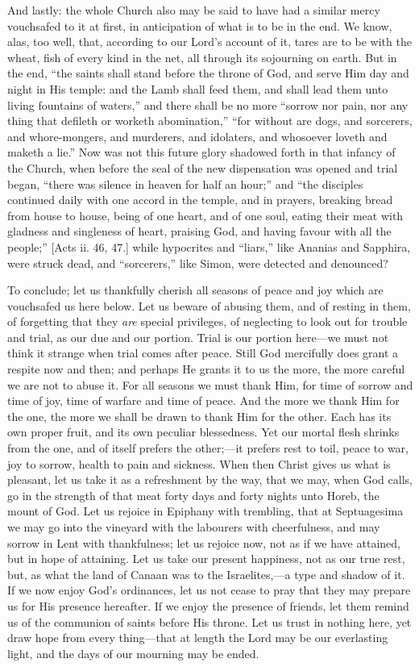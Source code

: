 And lastly: the whole Church also may be said to have had a similar
mercy vouchsafed to it at first, in anticipation of what is to be in
the end. We know, alas, too well, that, according to our Lord's
account of it, tares are to be with the wheat, fish of every kind in
the net, all through its sojourning on earth. But in the end,
``the saints shall stand before the throne of God, and serve Him
day and night in His temple: and the Lamb shall feed them, and shall
lead them unto living fountains of waters,'' and there shall be no
more ``sorrow nor pain, nor any thing that defileth or worketh
abomination,'' ``for without are dogs, and sorcerers, and
whore-mongers, and murderers, and idolaters, and whosoever loveth and
maketh a lie.'' Now was not this future glory shadowed forth in
that infancy of the Church, when before the seal of the new
dispensation was opened and trial began, ``there was silence in
heaven for half an hour;'' and ``the disciples continued daily
with one accord in the temple, and in prayers, breaking bread from
house to house, being of one heart, and of one soul, eating their meat
with gladness and singleness of heart, praising God, and having favour
with all the people;'' [Acts ii. 46, 47.] while hypocrites and
``liars,'' like Ananias and Sapphira, were struck dead, and
``sorcerers,'' like Simon, were detected and denounced?

To conclude; let us thankfully cherish all seasons of peace and joy
which are vouchsafed us here below. Let us beware of abusing them, and
of resting in them, of forgetting that they \emph{are} special
privileges, of neglecting to look out for trouble and trial, as our
due and our portion. Trial is our portion here—we must not think it
strange when trial comes after peace. Still God mercifully does grant
a respite now and then; and perhaps He grants it to us the more, the
more careful we are not to abuse it. For all seasons we must thank
Him, for time of sorrow and time of joy, time of warfare and time of
peace. And the more we thank Him for the one, the more we shall be
drawn to thank Him for the other. Each has its own proper fruit, and
its own peculiar blessedness. Yet our mortal flesh shrinks from the
one, and of itself prefers the other;—it prefers rest to toil, peace
to war, joy to sorrow, health to pain and sickness. When then Christ
gives us what is pleasant, let us take it as a refreshment by the way,
that we may, when God calls, go in the strength of that meat forty
days and forty nights unto Horeb, the mount of God. Let us rejoice in
Epiphany with trembling, that at Septuagesima we may go into the
vineyard with the labourers with cheerfulness, and may sorrow in Lent
with thankfulness; let us rejoice now, not as if we have attained, but
in hope of attaining. Let us take our present happiness, not as our
true rest, but, as what the land of Canaan was to the Israelites,—a
type and shadow of it. If we now enjoy God's ordinances, let us not
cease to pray that they may prepare us for His presence hereafter. If
we enjoy the presence of friends, let them remind us of the communion
of saints before His throne. Let us trust in nothing here, yet draw
hope from every thing—that at length the Lord may be our everlasting
light, and the days of our mourning may be ended.

